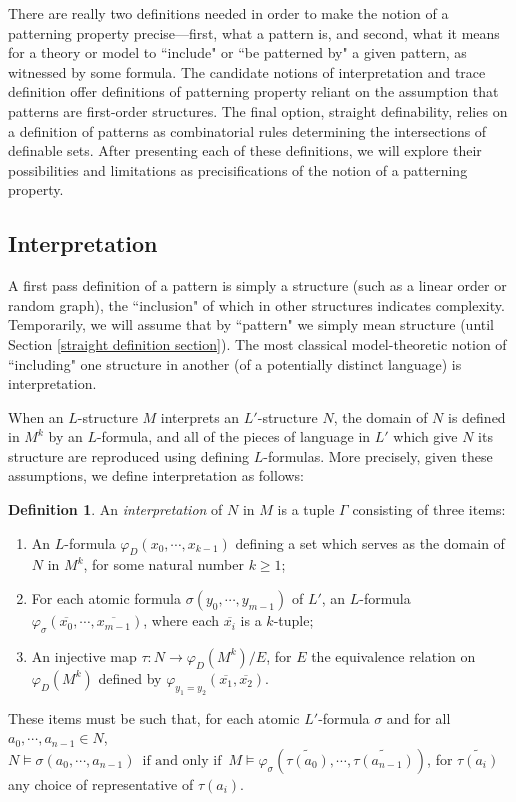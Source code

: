 \documentclass{article}
\newcommand{\IFF}{\enspace\text{if and only if}\enspace}
\newcommand{\vphi}{\varphi}
\theoremstyle{definition}
\newtheorem{definition}{Definition}
\theoremstyle{definition}
\theoremstyle{definition}
\begin{document}
There are really two definitions needed in order to make the notion of a patterning property precise---first, what a pattern is, and second, what it means for a theory or model to ``include" or ``be patterned by" a given pattern, as witnessed by some formula. The candidate notions of interpretation and trace definition offer definitions of patterning property reliant on the assumption that patterns are first-order structures. The final option, straight definability, relies on a definition of patterns as combinatorial rules determining the intersections of definable sets. After presenting each of these definitions, we will explore their possibilities and limitations as precisifications of the notion of a patterning property.



\subsection{Interpretation}\label{interpretation section}

A first pass definition of a pattern is simply a structure (such as a linear order or random graph), the ``inclusion" of which in other structures indicates complexity. Temporarily, we will assume that by ``pattern" we simply mean structure (until Section \ref{straight definition section}). The most classical model-theoretic notion of ``including" one structure in another (of a potentially distinct language) is interpretation. 

When an $L$-structure $M$ interprets an $L'$-structure $N$, the domain of $N$ is defined in $M^k$ by an $L$-formula, and all of the pieces of language in $L'$ which give $N$ its structure are reproduced using defining $L$-formulas. More precisely, given these assumptions, we define interpretation as follows:

\begin{definition}\label{interpretation definition}
    An \textit{interpretation} of $N$ in $M$ is a tuple $\Gamma$ consisting of three items: 
    \begin{enumerate}
        \item An $L$-formula $\vphi_D(x_0,\dotsm, x_{k-1})$ defining a set which serves as the domain of $N$ in $M^k$, for some natural number $k\geq 1$; 

        \item For each atomic formula $\sigma(y_0,\dotsm, y_{m-1})$ of $L'$, an $L$-formula $\vphi_\sigma(\overline{x_0},\dotsm, \overline{x_{m-1}})$, where each $\overline{x_i}$ is a $k$-tuple;

        \item An injective map $\tau\colon N \to \vphi_D(M^k)/E$, for $E$ the equivalence relation on $\vphi_D(M^k)$ defined by $\varphi_{y_1=y_2}(\overline{x_1}, \overline{x_2})$. 
    \end{enumerate} 

These items must be such that, for each atomic $L'$-formula $\sigma$ and for all $a_0,\dotsm, a_{n-1}\in N$, $N\models \sigma(a_0,\dotsm, a_{n-1}) \IFF M\models \vphi_\sigma(\tilde{\tau(a_0)},\dotsm,\tilde{\tau(a_{n-1})})$, for $\tilde{\tau(a_{i})}$ any choice of representative of $\tau(a_{i})$.
\end{definition} 
\end{document}
